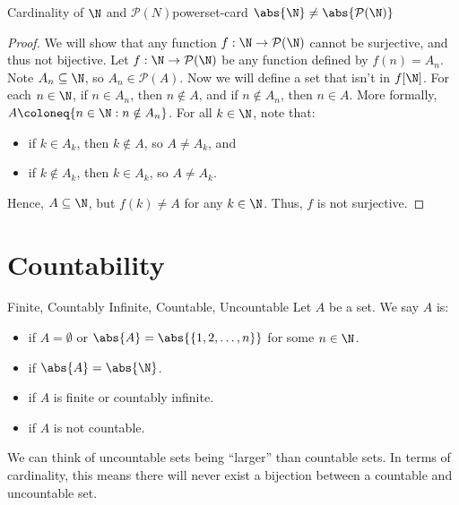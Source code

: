 \begin{exbox}{Cardinality of $\N$ and $\mathcal{P}(N)$}{powerset-card}
    $\abs{\N} \neq \abs{\mathcal{P}(\N)}$
    \tcblower
    \begin{proof}
        We will show that any function $f : \N \to \mathcal{P}(\N)$ cannot be surjective, and thus not bijective. Let $f : \N \to \mathcal{P}(\N)$ be any function defined by $f(n) = A_n$. Note $A_n \subseteq \N$, so $A_n \in \mathcal{P}(A)$. Now we will define a set that isn't in $f[\N]$. For each $n \in \N$, if $n \in A_n$, then $n \notin A$, and if $n \notin A_n$, then $n \in A$. More formally, $A \coloneq \{ n \in \N : n \notin A_n \}$. For all $k \in \N$, note that:
        \begin{itemize}[noitemsep]
            \item if $k \in A_k$, then $k \notin A$, so $A \neq A_k$, and
            \item if $k \notin A_k$, then $k \in A_k$, so $A \neq A_k$.
        \end{itemize}
        Hence, $A \subseteq \N$, but $f(k) \neq A$ for any $k \in \N$. Thus, $f$ is not surjective.
    \end{proof}
\end{exbox}

\section{Countability}
\begin{dfnbox}{Finite, Countably Infinite, Countable, Uncountable}{}
    Let $A$ be a set. We say $A$ is:
    \begin{itemize}[noitemsep]
        \item {} if $A = \emptyset$ or $\abs{A} = \abs{\{1, 2, \ldots, n\}}$ for some $n \in \N$.
        \item {} if $\abs{A} = \abs{\N}$.
        \item {} if $A$ is finite or countably infinite.
        \item {} if $A$ is not countable.
    \end{itemize}
\end{dfnbox}

We can think of uncountable sets being ``larger'' than countable sets. In terms of cardinality, this means there will never exist a bijection between a countable and uncountable set.

